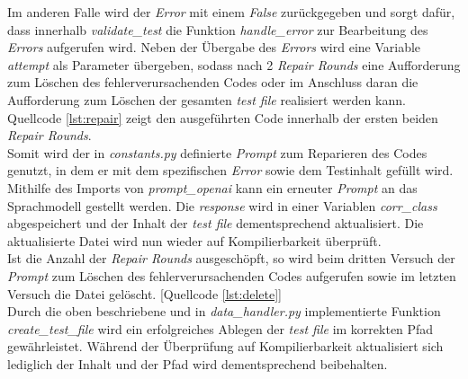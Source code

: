\vspace{-.3cm} 
Im anderen Falle wird der \textit{Error} mit einem \textit{False} zurückgegeben und sorgt dafür, dass innerhalb \textit{validate\_test} die Funktion \textit{handle\_error} zur Bearbeitung des \textit{Errors} aufgerufen wird. Neben der Übergabe des \textit{Errors} wird eine Variable \textit{attempt} als Parameter übergeben, sodass nach 2 \textit{Repair Rounds} eine Aufforderung zum Löschen des fehlerverursachenden Codes oder im Anschluss daran die Aufforderung zum Löschen der gesamten \textit{test file} realisiert werden kann. \\Quellcode \ref{lst:repair} zeigt den ausgeführten Code innerhalb der ersten beiden \textit{Repair Rounds}.\\
\vspace{-.3cm}
Somit wird der in \textit{constants.py} definierte \textit{Prompt} zum Reparieren des Codes genutzt, in dem er mit dem spezifischen \textit{Error} sowie dem Testinhalt gefüllt wird. Mithilfe des Imports von \textit{prompt\_openai} kann ein erneuter \textit{Prompt} an das Sprachmodell gestellt werden. Die \textit{response} wird in einer Variablen \textit{corr\_class} abgespeichert und der Inhalt der \textit{test file} dementsprechend aktualisiert. Die aktualisierte Datei wird nun wieder auf Kompilierbarkeit überprüft. \\Ist die Anzahl der \textit{Repair Rounds} ausgeschöpft, so wird beim dritten Versuch der \textit{Prompt} zum Löschen des fehlerverursachenden Codes aufgerufen sowie im letzten Versuch die Datei gelöscht. [Quellcode \ref{lst:delete}]\\
\vspace{-.3cm}
Durch die oben beschriebene und in \textit{data\_handler.py} implementierte Funktion \textit{create\_test\_file} wird ein erfolgreiches Ablegen der \textit{test file} im korrekten Pfad gewährleistet. Während der Überprüfung auf Kompilierbarkeit aktualisiert sich lediglich der Inhalt und der Pfad wird dementsprechend beibehalten.

